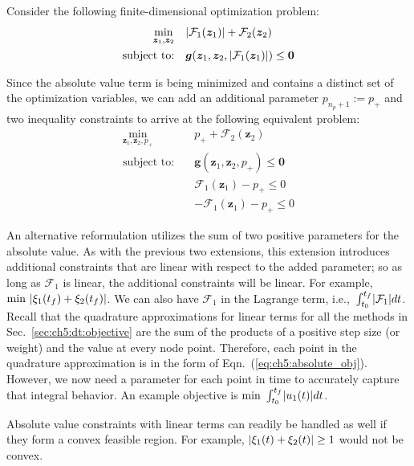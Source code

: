 Consider the following finite-dimensional optimization problem:%
\begin{subequations} \label{eq:ch5:absolute}
\begin{align} 
\min_{\bm{z}_1, \bm{z}_2 } \quad &\abs*{\mathcal{F}_1(\bm{z}_1)} + \mathcal{F}_2(\bm{z}_2) \label{eq:ch5:absolute_obj} \\
\text{subject to:} \quad & \bm{g}(\bm{z}_1, \bm{z}_2, \abs*{\mathcal{F}_1(\bm{z}_1)}) \leq \bm{0}
\end{align}
\end{subequations}%

\noindent Since the absolute value term is being minimized and contains a distinct set of the optimization variables, we can add an additional parameter $p_{n_p+1} := p_+$ and two inequality constraints to arrive at the following equivalent problem:%
\begin{subequations}%
\begin{align}
\min_{\bm{z}_1, \bm{z}_2, p_+} \quad & p_+ + \mathcal{F}_2(\bm{z}_2) \\
\text{subject to:} \quad & \bm{g}(\bm{z}_1, \bm{z}_2, p_+ ) \leq \bm{0} \\
& \mathcal{F}_1(\bm{z}_1) - p_+ \leq 0 \\
& -\mathcal{F}_1(\bm{z}_1) - p_+ \leq 0
\end{align}
\end{subequations}%

\noindent An alternative reformulation utilizes the sum of two positive parameters for the absolute value. %
As with the previous two extensions, this extension introduces additional constraints that are linear with respect to the added parameter; so as long as $\mathcal{F}_1$ is linear, the additional constraints will be linear.
For example, $\min\ \lvert\xi_1(t_f) + \xi_2(t_f)\rvert$.
We can also have $\mathcal{F}_1$ in the Lagrange term, i.e.,~$ \int_{t_0}^{t_f} \abs*{\mathcal{F}_1} dt$.
Recall that the quadrature approximations for linear terms for all the methods in Sec.~\ref{sec:ch5:dt:objective} are the sum of the products of a positive step size (or weight) and the value at every node point.
Therefore, each point in the quadrature approximation is in the form of Eqn.~(\ref{eq:ch5:absolute_obj}).
However, we now need a parameter for each point in time to accurately capture that integral behavior.
An example objective is $\min \ \int_{t_0}^{t_f} \lvert u_1(t)\rvert dt$.

Absolute value constraints with linear terms can readily be handled as well if they form a convex feasible region. %
For example, $\lvert\xi_1(t) + \xi_2(t)\rvert \geq 1$ would not be convex.

